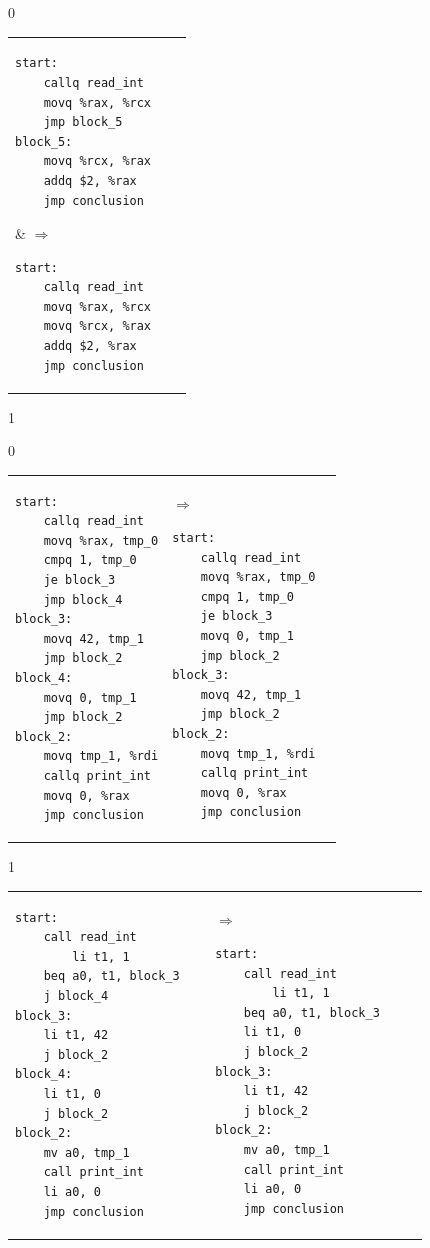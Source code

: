 \documentclass[7x10]{TimesAPriori_MIT}%
\def\racketEd{0}
\def\pythonEd{1}
\def\edition{1}
\def\xeightysixEd{0}
\def\riscvEd{1}
\def\architecture{1}
\newcommand{\pythonColor}[0]{}
\numberwithin{theorem}{chapter}
\numberwithin{definition}{chapter}
\numberwithin{equation}{chapter}
\begin{document}
\begin{figure}[tbp]
\begin{tcolorbox}[colback=white]
{\if\edition\racketEd        
\begin{tabular}{lll}
\begin{minipage}{0.5\textwidth}
\begin{lstlisting}
start:
    callq read_int
    movq %rax, %rcx
    jmp block_5
block_5:
    movq %rcx, %rax
    addq $2, %rax
    jmp conclusion
\end{lstlisting}
\end{minipage}
&
$\Rightarrow\qquad$
\begin{minipage}{0.4\textwidth}
\begin{lstlisting}
start:
    callq read_int
    movq %rax, %rcx
    movq %rcx, %rax
    addq $2, %rax
    jmp conclusion
\end{lstlisting}
\end{minipage}
\end{tabular}
\fi}
{\if\edition\pythonEd\pythonColor
  {\if\architecture\xeightysixEd
\begin{tabular}{lll}
\begin{minipage}{0.5\textwidth}
\begin{lstlisting}
start:
	callq read_int
	movq %rax, tmp_0
	cmpq 1, tmp_0
	je block_3
	jmp block_4
block_3:
	movq 42, tmp_1
	jmp block_2
block_4:
	movq 0, tmp_1
	jmp block_2
block_2:
	movq tmp_1, %rdi
	callq print_int
	movq 0, %rax
	jmp conclusion
\end{lstlisting}
\end{minipage}
&
$\Rightarrow\qquad$
\begin{minipage}{0.4\textwidth}
\begin{lstlisting}
start:
	callq read_int
	movq %rax, tmp_0
	cmpq 1, tmp_0
	je block_3
	movq 0, tmp_1
	jmp block_2
block_3:
	movq 42, tmp_1
	jmp block_2
block_2:
	movq tmp_1, %rdi
	callq print_int
	movq 0, %rax
	jmp conclusion
\end{lstlisting}
\end{minipage}
\end{tabular}
\fi}
{\if\architecture\riscvEd
\begin{tabular}{lll}
\begin{minipage}{0.5\textwidth}
\begin{lstlisting}
start:
	call read_int
        li t1, 1
	beq a0, t1, block_3
	j block_4
block_3:
	li t1, 42
	j block_2
block_4:
	li t1, 0
	j block_2
block_2:
	mv a0, tmp_1
	call print_int
	li a0, 0
	jmp conclusion        
\end{lstlisting}
\end{minipage}
&
$\Rightarrow\qquad$
\begin{minipage}{0.4\textwidth}
\begin{lstlisting}
start:
	call read_int
        li t1, 1
	beq a0, t1, block_3
	li t1, 0
	j block_2
block_3:
	li t1, 42
	j block_2
block_2:
	mv a0, tmp_1
	call print_int
	li a0, 0
	jmp conclusion        
\end{lstlisting}
\end{minipage}
\end{tabular}
\fi}
\fi}
\end{tcolorbox}


\end{figure}
\end{document}

